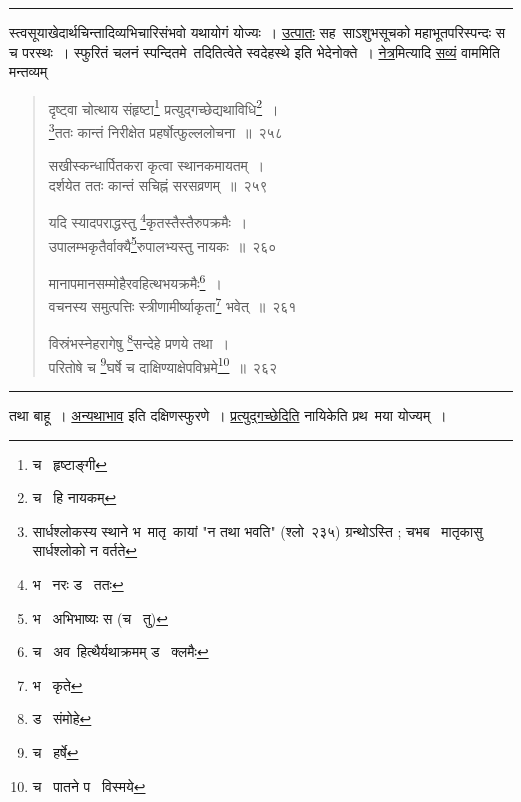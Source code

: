 \documentclass[11pt, openany]{book}
\begin{document}
\hrule

\vspace{2mm}
\noindent
स्त्वसूयाखेदार्थचिन्तादिव्यभिचारिसंभवो यथायोगं योज्यः~। \underline{उत्पातः} सह\textendash\ साऽशुभसूचको महाभूतपरिस्पन्दः स च परस्थः~। स्फुरितं चलनं स्पन्दितमे\textendash\ तदितित्वेते स्वदेहस्थे इति भेदेनोक्ते~। \underline{नेत्र}मित्यादि \underline{सव्यं} वाममिति मन्तव्यम्


\newpage
\lfoot{}

\begin{quote}
{\na दृष्ट्वा चोत्थाय संहृष्टा\renewcommand{\thefootnote}{1}\footnote{च \textendash\  हृष्टाङ्गी} प्रत्युद्गच्छेद्यथाविधि\renewcommand{\thefootnote}{2}\footnote{च \textendash\  हि नायकम्}~।\\
\renewcommand{\thefootnote}{3}\footnote{सार्धश्लोकस्य स्थाने भ\textendash\  मातृ\textendash\ कायां "न तथा भवति" (श्लो\textendash\ २३५) ग्रन्थोऽस्ति ; चभब \textendash\  मातृकासु सार्धश्लोको न वर्तते}ततः कान्तं निरीक्षेत प्रहर्षोत्फुल्ललोचना~॥~२५८ 

सखीस्कन्धार्पितकरा कृत्वा स्थानकमायतम्~।\\
दर्शयेत ततः कान्तं सचिह्नं सरसव्रणम्~॥~२५९ 

यदि स्यादपराद्धस्तु \renewcommand{\thefootnote}{4}\footnote{भ \textendash\  नरः ड \textendash\  ततः}कृतस्तैस्तैरुपक्रमैः~।\\
उपालम्भकृतैर्वाक्यै\renewcommand{\thefootnote}{5}\footnote{भ \textendash\  अभिभाष्यः स (च \textendash\  तु)}रुपालभ्यस्तु नायकः~॥~२६० 

मानापमानसम्मोहैरवहित्थभयक्रमैः\renewcommand{\thefootnote}{6}\footnote{च \textendash\  अव\textendash\ हित्थैर्यथाक्रमम् ड \textendash\  क्लमैः}~।\\
वचनस्य समुत्पत्तिः स्त्रीणामीर्ष्याकृता\renewcommand{\thefootnote}{7}\footnote{भ \textendash\  कृते} भवेत्~॥~२६१ 

विस्रंभस्नेहरागेषु \renewcommand{\thefootnote}{8}\footnote{ड \textendash\  संमोहे}सन्देहे प्रणये तथा~।\\
परितोषे च \renewcommand{\thefootnote}{9}\footnote{च \textendash\  हर्षे}घर्षे च दाक्षिण्याक्षेपविभ्रमे\renewcommand{\thefootnote}{10}\footnote{च \textendash\  पातने प \textendash\  विस्मये}~॥~२६२}
\end{quote}

\hrule

\vspace{2mm}
\noindent
तथा बाहू~। \underline{अन्यथाभाव} इति दक्षिणस्फुरणे~। \underline{प्रत्युद्गच्छेदिति} नायिकेति प्रथ\textendash\ मया योज्यम्~।\\
\end{document}
